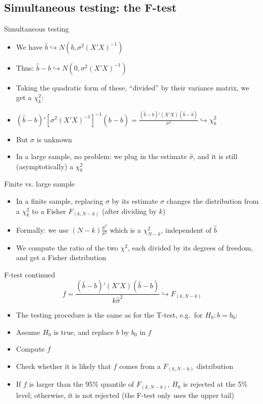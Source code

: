 \documentclass[aspectratio=169]{beamer}
\begin{document}
\subsection{Simultaneous testing: the F-test}

\begin{frame}{Simultaneous testing}
\begin{itemize}
    \item We have $\hat{b} \hookrightarrow N(b, \sigma^2(X'X)^{-1})$
    \item Thus: $\hat{b} - b \hookrightarrow N(0, \sigma^2(X'X)^{-1})$
    \item Taking the quadratic form of these, ``divided'' by their variance matrix, we get a $\chi_k^2$:
    \item $(\hat{b} - b)'[\sigma^2(X'X)^{-1}]^{-1}(\hat{b} - b) = \frac{(\hat{b} - b)'(X'X)(\hat{b} - b)}{\sigma^2} \hookrightarrow \chi_k^2$
    \item But $\sigma$ is unknown
    \item In a large sample, no problem: we plug in the estimate $\hat{\sigma}$, and it is still (asymptotically) a $\chi_k^2$
\end{itemize}
\end{frame}

\begin{frame}{Finite vs. large sample}
\begin{itemize}
    \item In a finite sample, replacing $\sigma$ by its estimate $\hat{\sigma}$ changes the distribution from a $\chi_k^2$ to a Fisher $F_{(k,N-k)}$ (after dividing by $k$)
    \item Formally: we use $(N - k)\frac{\hat{\sigma}^2}{\sigma^2}$ which is a $\chi_{N-k}^2$, independent of $\hat{b}$
    \item We compute the ratio of the two $\chi^2$, each divided by its degrees of freedom, and get a Fisher distribution
\end{itemize}
\end{frame}

\begin{frame}{F-test continued}
\[
f = \frac{(\hat{b} - b)'(X'X)(\hat{b} - b)}{k\hat{\sigma}^2} \hookrightarrow F_{(k,N-k)}
\]

\begin{itemize}
    \item The testing procedure is the same as for the T-test, e.g.\ for $H_0: b = b_0$:
    \item Assume $H_0$ is true, and replace $b$ by $b_0$ in $f$
    \item Compute $f$
    \item Check whether it is likely that $f$ comes from a $F_{(k,N-k)}$ distribution
    \item If $f$ is larger than the 95\% quantile of $F_{(k,N-k)}$, $H_0$ is rejected at the 5\% level; otherwise, it is not rejected (the F-test only uses the upper tail)
\end{itemize}
\end{frame}
\end{document}
